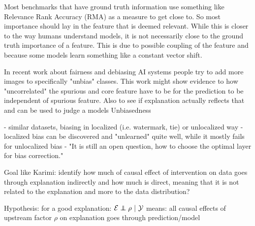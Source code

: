 {Most benchmarks that have ground truth information use something like Relevance Rank Accuracy (RMA) as a measure to get close to. So most importance should lay in the feature that is deemed relevant. While this is closer to the way humans understand models, it is not necessarily close to the ground truth importance of a feature. This is due to possible coupling of the feature and because some models learn something like a constant vector shift. 


In recent work about fairness and debiasing AI systems people try to add more images to specifically "unbias" classes. This work might show evidence to how "uncorrelated" the spurious and core feature have to be for the prediction to be independent of spurious feature. Also to see if explanation actually reflects that and can be used to judge a models Unbiasedness

\cite{Dreyer2023a}
- similar datasets, biasing in localized (i.e. watermark, tie) or unlocalized way
- localized bias can be discovered and "unlearned" quite well, while it mostly fails for unlocalized bias
- "It is still an open question, how to choose the optimal layer for bias correction."
}

Goal like Karimi: identify how much of causal effect of intervention on data goes through explanation indirectly and how much is direct, meaning that it is not related to the explanation and more to the data distribution?

Hypothesis: for a good explanation:
$\mathcal{E} \independent \rho \ | \ \mathcal{Y}$
means: all causal effects of upstream factor $\rho$ on explanation goes through prediction/model
